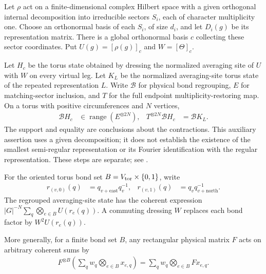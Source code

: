 \begin{lemma}%
    \label{thm:peps_torus_multiplicity_bond_state}
    \leanok
    Let $\rho$ act on a finite-dimensional complex Hilbert space with a
    given orthogonal internal decomposition into irreducible sectors
    $S_i$, each of character multiplicity one. Choose an orthonormal basis
    of each $S_i$, of size $d_i$, and let $D_i(g)$ be its representation matrix.
    There is a global orthonormal basis $c$ collecting these sector coordinates.
    Put $U(g)=[\rho(g)]_c$ and $W=[\Theta]_c$.

    Let $H_c$ be the torus state obtained by dressing the normalized
    averaging site of $U$ with $W$ on every virtual leg. Let $K_L$ be the
    normalized averaging-site torus state of the repeated representation
    $L$. Write $\mathcal B$ for physical bond regrouping, $E$ for matching-sector
    inclusion, and $T$ for the full endpoint multiplicity-restoring map.
    On a torus with positive circumferences and $N$ vertices,
    \begin{align}
        \mathcal B H_c               & \in\operatorname{range}(E^{\otimes 2N}), &
        T^{\otimes 2N}\mathcal B H_c & =\mathcal B K_L.
    \end{align}
    The support and equality are conclusions about the contractions.
    This auxiliary assertion uses a given decomposition; it does not
    establish the existence of the smallest semi-regular representation or
    its Fourier identification with the regular representation. These steps
    are separate; see \cite{gap:rmp_peps_quantum_double_g_isometry}.

    For the oriented torus bond set $B=V_{\rm tor}\times\{0,1\}$, write
    \begin{align}
        r_{(v,0)}(q) & =q_{v+\mathrm{east}}q_v^{-1},  &
        r_{(v,1)}(q) & =q_vq_{v+\mathrm{north}}^{-1}.
    \end{align}
    The regrouped averaging-site state has the coherent expression
    $|G|^{-N}\sum_q\bigotimes_{e\in B}U(r_e(q))$.
    A commuting dressing $W$ replaces each bond factor by $W^2U(r_e(q))$.

    More generally, for a finite bond set $B$, any rectangular physical matrix
    $F$ acts on arbitrary coherent sums by
    \begin{align}
        F^{\otimes B}\left(\sum_q w_q\bigotimes_{e\in B}x_{e,q}\right)
        =\sum_q w_q\bigotimes_{e\in B}Fx_{e,q}.
    \end{align}
\end{lemma}


